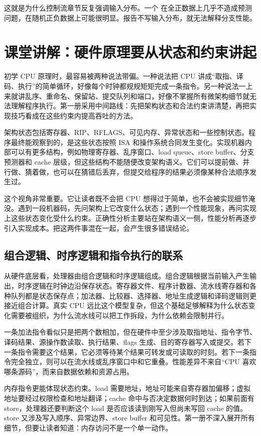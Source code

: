 这就是为什么控制流章节反复强调输入分布。一个  在全正数据上几乎不造成预测问题，在随机正负数据上可能很明显。报告不写输入分布，就无法解释分支性能。

\section{课堂讲解：硬件原理要从状态和约束讲起}

初学 CPU 原理时，最容易被两种说法带偏。一种说法把 CPU 讲成“取指、译码、执行”的简单循环，好像每个时钟都规规矩矩完成一条指令。另一种说法一上来就讲乱序、重命名、保留站、提交队列和端口，好像不掌握所有微架构细节就无法理解程序执行。第一册采用中间路线：先把架构状态和合法约束讲清楚，再把实现技巧看成在这些约束内提高吞吐的方法。

架构状态包括寄存器、RIP、RFLAGS、可见内存、异常状态和一些控制状态。程序最终能观察到的，是这些状态按照 ISA 和操作系统合同发生变化。实现机器内部可以有更多结构，例如物理寄存器、乱序窗口、load queue、store buffer、分支预测器和 cache 层级，但这些结构不能随便改变架构语义。它们可以提前做、并行做、猜着做，也可以在猜错后丢弃，但提交给程序的结果必须像某种合法顺序发生过。

这个视角非常重要。它让读者既不会把 CPU 想得过于简单，也不会被实现细节淹没。遇到一段机器码，先问架构上它改变什么状态；遇到一个性能现象，再问实现上这些状态变化受什么约束。正确性分析主要站在架构语义一侧，性能分析再逐步引入实现成本。把这两件事混在一起，会产生很多错误结论。

\subsection{组合逻辑、时序逻辑和指令执行的联系}

从硬件底层看，处理器由组合逻辑和时序逻辑组成。组合逻辑根据当前输入产生输出，时序逻辑在时钟边沿保存状态。寄存器文件、程序计数器、流水线寄存器和各种队列都是状态保存点；加法器、比较器、选择器、地址生成逻辑和译码逻辑则更接近组合计算。真实 CPU 远比这个模型复杂，但这个基础足够解释为什么状态变化需要被组织，为什么流水线可以把工作拆段，为什么依赖会限制并行。

一条加法指令看似只是把两个数相加，但在硬件中至少涉及取指地址、指令字节、译码结果、源操作数读取、执行结果、flags 生成、目的寄存器写入或提交。若下一条指令需要这个结果，它必须等待某个结果可转发或可读取的时刻。若下一条指令完全独立，则可以在流水线或乱序窗口中和它重叠。性能差异不来自“CPU 喜欢哪条源码”，而来自数据依赖和资源占用。

内存指令更能体现状态约束。load 需要地址，地址可能来自寄存器加偏移；虚拟地址要经过权限检查和地址翻译；cache 命中与否决定数据何时到达；如果前面有 store，处理器还要判断这个 load 是否应该读到刚写入但尚未写回 cache 的值。store 又涉及写入顺序、异常边界、store buffer 和可见性。第一册不深入展开所有细节，但要让读者知道：内存访问不是一个单一动作。

